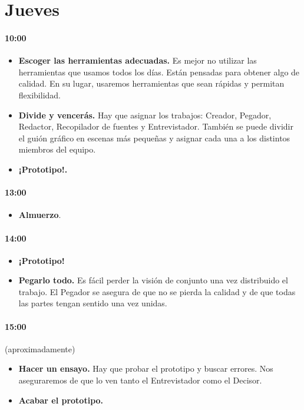 \documentclass[10pt]{article}
\begin{document}
\section*{\center Jueves}
\begin{multicols}{2}
\paragraph{10:00}
\begin{itemize}
\item \textbf{Escoger las herramientas adecuadas.} Es mejor no utilizar las herramientas que usamos todos los días. Están pensadas para obtener algo de calidad. En su lugar, usaremos herramientas que sean rápidas y permitan flexibilidad.
\item \textbf{Divide y vencerás.} Hay que asignar los trabajos: Creador, Pegador, Redactor, Recopilador de fuentes y Entrevistador. También se puede dividir el guión gráfico en escenas más pequeñas y asignar cada una a los distintos miembros del equipo.
\item \textbf{¡Prototipo!.}
\end{itemize}
\paragraph{13:00}
\begin{itemize}
\item \textbf{Almuerzo}.
\end{itemize}
\paragraph{14:00}
\begin{itemize}
\item \textbf{¡Prototipo!}
\item \textbf{Pegarlo todo.} Es fácil perder la visión de conjunto una vez distribuido el trabajo. El Pegador se asegura de que no se pierda la calidad y de que todas las partes tengan sentido una vez unidas.
\end{itemize}
\paragraph{15:00}(aproximadamente)
\begin{itemize}
\item \textbf{Hacer un ensayo.} Hay que probar el prototipo y buscar errores. Nos aseguraremos de que lo ven tanto el Entrevistador como el Decisor.
\item \textbf{Acabar el prototipo.}
\end{itemize}

\end{multicols}
\end{document}
